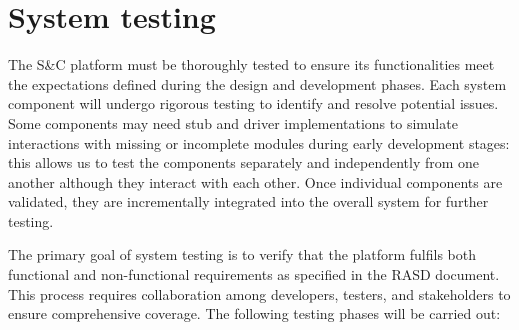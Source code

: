 \newpage
\section{System testing}
The S\&C platform must be thoroughly tested to ensure its functionalities meet the expectations defined during the design and development phases. Each system component will undergo rigorous testing to identify and resolve potential issues. Some components may need stub and driver implementations to simulate interactions with missing or incomplete modules during early development stages: this allows us to test the components separately and independently from one another although they interact with each other. Once individual components are validated, they are incrementally integrated into the overall system for further testing.

The primary goal of system testing is to verify that the platform fulfils both functional and non-functional requirements as specified in the RASD document. This process requires collaboration among developers, testers, and stakeholders to ensure comprehensive coverage. The following testing phases will be carried out:

